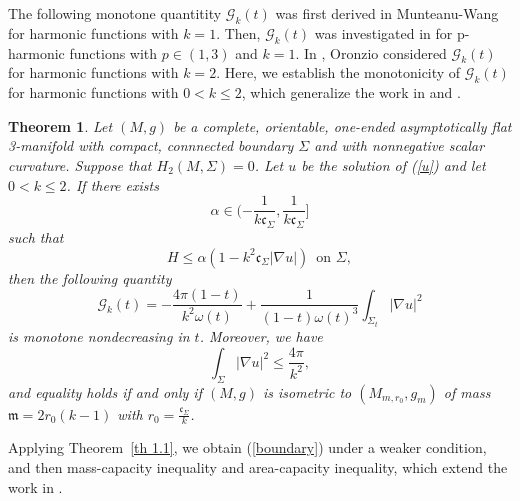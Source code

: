 \documentclass[12pt]{article}
\theoremstyle{definition}
\theoremstyle{plain}
\newtheorem{theorem}{Theorem}[section]
\numberwithin{equation}{section}
\begin{document}
The following monotone quantitity $ \mathcal{G}_{k}(t) $ was first derived in Munteanu-Wang \cite{Wang1} for harmonic functions with $ k=1 $. Then, $ \mathcal{G}_{k}(t) $ was investigated in \cite{Chan,Hrisch1} for p-harmonic functions with $ p\in (1,3) $ and $ k=1 $. In \cite{Oronzio}, Oronzio considered $ \mathcal{G}_{k}(t) $ for harmonic functions with $ k=2 $. Here, we establish the monotonicity of $ \mathcal{G}_{k}(t) $ for harmonic functions with $ 0<k\leq2 $, which generalize the work in \cite{Wang1} and \cite{Oronzio}.
\begin{theorem}\label{th 1.2}
Let $ (M,g) $ be a complete, orientable, one-ended asymptotically flat 3-manifold with compact, connnected boundary $ \Sigma $ and with nonnegative scalar curvature. Suppose that $ H_{2}(M,\Sigma)=0 $. Let $ u $ be the solution of (\ref{u}) and let $ 0<k\leq 2 $. If there exists 
\begin{equation}\label{a condi}
\alpha\in (-\frac{1}{k\mathfrak{c}_{\Sigma}},\frac{1}{k\mathfrak{c}_{\Sigma}}] \end{equation}
such that 
\begin{equation}\label{H condition0}
H\leq \alpha(1-k^{2}\mathfrak{c}_{\Sigma}|\nabla u|)\,\,\,\text{on }\Sigma,
\end{equation}
then the following quantity
\begin{equation}\label{G}
\mathcal{G}_{k}(t)=-\frac{4\pi(1-t)}{k^{2}\omega(t)}+\frac{1}{(1-t)\omega(t)^{3}}\int_{\Sigma_{t}}|\nabla u|^{2}
\end{equation}
is monotone nondecreasing in $ t $. Moreover, we have
\begin{equation}\label{boundary}
\int_{\Sigma}|\nabla u|^{2}\leq \frac{4\pi}{k^{2}},
\end{equation}
and equality holds if and only if  $ (M,g) $ is isometric to $ (M_{m,r_{0}},g_{m}) $ of mass $ \mathfrak{m}=2r_{0}(k-1) $ with $ r_{0}=\frac{\mathfrak{c}_{\Sigma}}{k} $.
\end{theorem}
Applying Theorem~\ref{th 1.1}, we obtain (\ref{boundary}) under a weaker condition, and then mass-capacity inequality and area-capacity inequality, which extend the work in \cite{Oronzio}.
\end{document}
